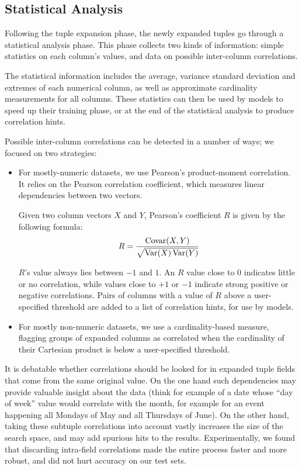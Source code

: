 \subsection{Statistical Analysis}
\label{sec:statistical-analysis}

Following the tuple expansion phase, the newly expanded tuples go through a statistical analysis phase. This phase collects two kinds of information: simple statistics on each column's values, and data on possible inter-column correlations.

The statistical information includes the average, variance standard deviation and extremes of each numerical column, as well as approximate cardinality measurements for all columns. These statistics can then be used by models to speed up their training phase, or at the end of the statistical analysis to produce correlation hints.

Possible inter-column correlations can be detected in a number of ways; we focused on two strategies:

\begin{itemize}
\item For mostly-numeric datasets, we use Pearson's product-moment
  correlation. It relies on the Pearson correlation coefficient,
  which measures linear dependencies between two vectors.

  Given two column vectors $X$ and $Y$, Pearson's coefficient $R$ is given by the following formula:
  \begin{align}
    \label{eqn:pearson}
    R = \frac{\operatorname{Covar}(X,Y)}{\sqrt{\operatorname{Var}(X)\operatorname{Var}(Y)}}
  \end{align}

  $R$'s value always lies between $-1$ and $1$. An $R$ value close to 0 indicates little or no correlation, while values close to $+1$ or $-1$ indicate strong positive or negative correlations. Pairs of columns with a value of \(R\) above a user-specified threshold are added to a list of correlation hints, for use by models.
\item For mostly non-numeric datasets, we use a cardinality-based measure, flagging groups of expanded columns as correlated when the cardinality of their Cartesian product is below a user-specified threshold.
\end{itemize}

It is debatable whether correlations should be looked for in expanded tuple fields that come from the same original value. On the one hand such dependencies may provide valuable insight about the data (think for example of a date whose ``day of week'' value would correlate with the month, for example for an event happening all Mondays of May and all Thursdays of June). On the other hand, taking these subtuple correlations into account vastly increases the size of the search space, and may add spurious hits to the results. Experimentally, we found that discarding intra-field correlations made the entire process faster and more robust, and did not hurt accuracy on our test sets.

